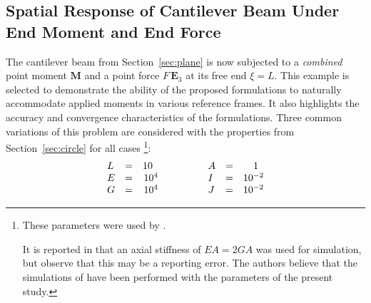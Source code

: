 %
\hypertarget{sec:helical}{%
\subsection{Spatial Response of Cantilever Beam Under End Moment and End Force}\label{sec:helical}}
%
%
The cantilever beam 
from Section~\ref{sec:plane} is now subjected to a \emph{combined} point moment \(\boldsymbol{M}\) 
and a point force \(F \, \mathbf{E}_3\) at its free end \(\xi=L\).
%
This example is selected to demonstrate the ability of the proposed formulations 
to naturally accommodate applied moments in various reference frames.
It also highlights the accuracy and convergence characteristics of the formulations.
Three common variations of this problem are considered
with the properties from Section~\ref{sec:circle} for all cases
\footnote{These parameters were used by \cite{ritto-corrêa2002differentiation,ibrahimbegovic1997choice}.

It is reported in \cite{ibrahimbegović1995computational} that an axial stiffness of \(EA=2GA\)
was used for simulation, but \cite{ritto-corrêa2002differentiation} observe that this may be a reporting error. The authors believe that the simulations of \cite{ibrahimbegović1995computational}
have been performed with the parameters of the present study.
}:
\[
\begin{array}{lcr}
    L  &=&    10\hphantom{..}    \\ %
    E  &=&    10^4  \\ %
    G  &=&    10^4  \\ %
\end{array}
\qquad\qquad
\begin{array}{lcr}
    A  &=& 1\hphantom{..} \\
    I  &=& 10^{-2} \\
    J  &=& 10^{-2} \\
\end{array}
\]
%
%
